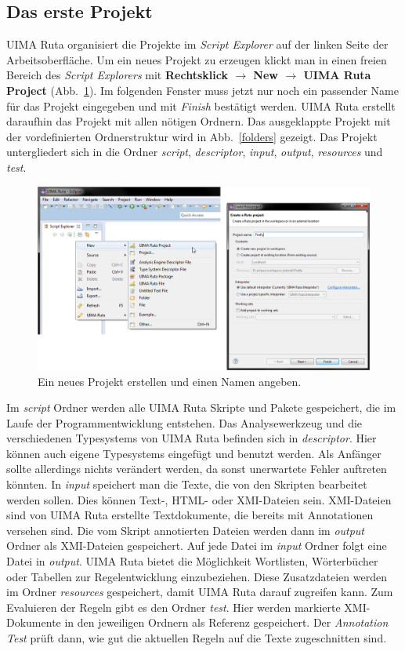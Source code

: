 \documentclass{article}
\begin{document}
\subsection{Das erste Projekt}\label{first_project}
UIMA Ruta organisiert die Projekte im \textit{Script Explorer} auf der linken Seite der Arbeitsoberfläche. Um ein neues Projekt zu erzeugen klickt man in einen freien Bereich des \textit{Script Explorers} mit \textbf{Rechtsklick $\rightarrow$ New $\rightarrow$ UIMA Ruta Project} (Abb.~\ref{newproject}). Im folgenden Fenster muss jetzt nur noch ein passender Name für das Projekt eingegeben und mit \textit{Finish} bestätigt werden. UIMA Ruta erstellt daraufhin das Projekt mit allen nötigen Ordnern. Das ausgeklappte Projekt mit der vordefinierten Ordnerstruktur wird in Abb.~\ref{folders} gezeigt. Das Projekt untergliedert sich in die Ordner \textit{script}, \textit{descriptor}, \textit{input}, \textit{output}, \textit{resources} und \textit{test}.

\begin{figure}
\centering
\includegraphics[width=1\textwidth]{figs/capture(4+5).png}
\caption{Ein neues Projekt erstellen und einen Namen angeben.}
\label{newproject}
\end{figure}

Im \textit{script} Ordner werden alle UIMA Ruta Skripte und Pakete gespeichert, die im Laufe der Programmentwicklung entstehen. Das Analysewerkzeug und die verschiedenen Typesystems von UIMA Ruta befinden sich in \textit{descriptor}. Hier können auch eigene Typesystems eingefügt und benutzt werden. Als Anfänger sollte allerdings nichts verändert werden, da sonst unerwartete Fehler auftreten könnten. In \textit{input} speichert man die Texte, die von den Skripten bearbeitet werden sollen. Dies können Text-, HTML- oder XMI-Dateien sein. XMI-Dateien sind von UIMA Ruta erstellte Textdokumente, die bereits mit Annotationen versehen sind. Die vom Skript annotierten Dateien werden dann im \textit{output} Ordner als XMI-Dateien gespeichert. Auf jede Datei im \textit{input} Ordner folgt eine Datei in \textit{output}. UIMA Ruta bietet die Möglichkeit Wortlisten, Wörterbücher oder Tabellen zur Regelentwicklung einzubeziehen. Diese Zusatzdateien werden im Ordner \textit{resources} gespeichert, damit UIMA Ruta darauf zugreifen kann. Zum Evaluieren der Regeln gibt es den Ordner \textit{test}. Hier werden markierte XMI-Dokumente in den jeweiligen Ordnern als Referenz gespeichert. Der \textit{Annotation Test} prüft dann, wie gut die aktuellen Regeln auf die Texte zugeschnitten sind.
\end{document}
